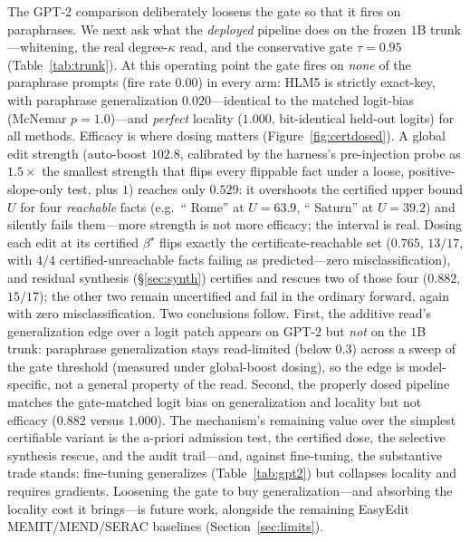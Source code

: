 \documentclass[10pt,twocolumn]{article}
\theoremstyle{remark}
\begin{document}
The GPT-2 comparison deliberately loosens the gate so that it fires on
paraphrases. We next ask what the \emph{deployed} pipeline does on the frozen
$1$B trunk---whitening, the real degree-$\kappa$ read, and the conservative gate
$\tau=0.95$ (Table~\ref{tab:trunk}). At this operating point the gate fires on
\emph{none} of the paraphrase prompts (fire rate $0.00$) in every arm: HLM5 is
strictly exact-key, with paraphrase generalization $0.020$---identical to the
matched logit-bias (McNemar $p=1.0$)---and \emph{perfect} locality ($1.000$,
bit-identical held-out logits) for all methods. Efficacy is where dosing
matters (Figure~\ref{fig:certdosed}). A global edit strength (auto-boost
$102.8$, calibrated by the harness's pre-injection probe as $1.5\times$ the
smallest strength that flips every flippable fact under a loose,
positive-slope-only test, plus $1$) reaches only $0.529$: it
overshoots the certified upper bound $U$ for four \emph{reachable} facts (e.g.\
`` Rome'' at $U=63.9$, `` Saturn'' at $U=39.2$) and silently fails them---more
strength is not more efficacy; the interval is real. Dosing each edit at its
certified $\beta^{\star}$ flips exactly the certificate-reachable set ($0.765$,
$13/17$, with $4/4$ certified-unreachable facts failing as predicted---zero
misclassification), and residual synthesis (\S\ref{sec:synth}) certifies and
rescues two of those four ($0.882$, $15/17$); the other two remain
uncertified and fail in the ordinary forward, again with zero
misclassification. Two conclusions follow. First, the additive read's
generalization edge over a logit patch appears on GPT-2 but \emph{not} on the
$1$B trunk: paraphrase generalization stays read-limited (below $0.3$) across a
sweep of the gate threshold (measured under global-boost dosing), so the edge is
model-specific, not a general property of the read. Second, the properly dosed
pipeline matches the gate-matched logit bias on generalization and locality but
not efficacy ($0.882$ versus $1.000$). The mechanism's remaining value over the
simplest certifiable variant is the a-priori admission test, the certified dose,
the selective synthesis rescue, and the audit trail---and,
against fine-tuning, the substantive trade stands: fine-tuning generalizes
(Table~\ref{tab:gpt2}) but collapses locality and requires gradients. Loosening
the gate to buy generalization---and absorbing the locality cost it brings---is
future work, alongside the remaining EasyEdit MEMIT/MEND/SERAC baselines
(Section~\ref{sec:limits}).
\end{document}
